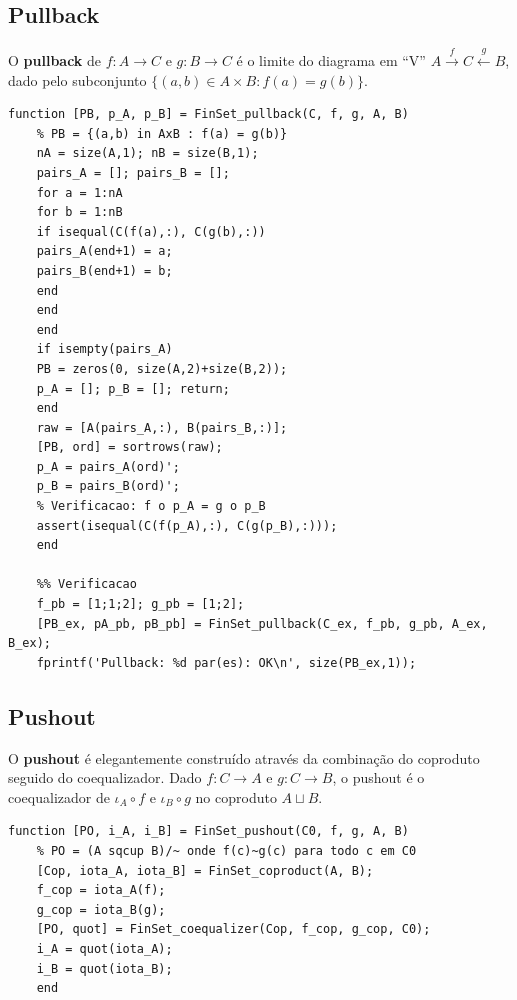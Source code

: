 \subsection{Pullback}

O \textbf{pullback} de $f: A \to C$ e $g: B \to C$ é o limite
do diagrama em ``V'' $A \xrightarrow{f} C \xleftarrow{g} B$,
dado pelo subconjunto
$\{(a,b) \in A \times B : f(a) = g(b)\}$.

\begin{lstlisting}[style=matlab, caption={Pullback em FinSet}]
	function [PB, p_A, p_B] = FinSet_pullback(C, f, g, A, B)
	% PB = {(a,b) in AxB : f(a) = g(b)}
	nA = size(A,1); nB = size(B,1);
	pairs_A = []; pairs_B = [];
	for a = 1:nA
	for b = 1:nB
	if isequal(C(f(a),:), C(g(b),:))
	pairs_A(end+1) = a;
	pairs_B(end+1) = b;
	end
	end
	end
	if isempty(pairs_A)
	PB = zeros(0, size(A,2)+size(B,2));
	p_A = []; p_B = []; return;
	end
	raw = [A(pairs_A,:), B(pairs_B,:)];
	[PB, ord] = sortrows(raw);
	p_A = pairs_A(ord)';
	p_B = pairs_B(ord)';
	% Verificacao: f o p_A = g o p_B
	assert(isequal(C(f(p_A),:), C(g(p_B),:)));
	end
	
	%% Verificacao
	f_pb = [1;1;2]; g_pb = [1;2];
	[PB_ex, pA_pb, pB_pb] = FinSet_pullback(C_ex, f_pb, g_pb, A_ex, B_ex);
	fprintf('Pullback: %d par(es): OK\n', size(PB_ex,1));
\end{lstlisting}

\subsection{Pushout}

O \textbf{pushout} é elegantemente construído através da
combinação do coproduto seguido do coequalizador. Dado
$f: C \to A$ e $g: C \to B$, o pushout é o coequalizador
de $\iota_A \circ f$ e $\iota_B \circ g$ no coproduto
$A \sqcup B$.

\begin{lstlisting}[style=matlab, caption={Pushout em FinSet (coproduto + coequalizador)}]
	function [PO, i_A, i_B] = FinSet_pushout(C0, f, g, A, B)
	% PO = (A sqcup B)/~ onde f(c)~g(c) para todo c em C0
	[Cop, iota_A, iota_B] = FinSet_coproduct(A, B);
	f_cop = iota_A(f);
	g_cop = iota_B(g);
	[PO, quot] = FinSet_coequalizer(Cop, f_cop, g_cop, C0);
	i_A = quot(iota_A);
	i_B = quot(iota_B);
	end
\end{lstlisting}

